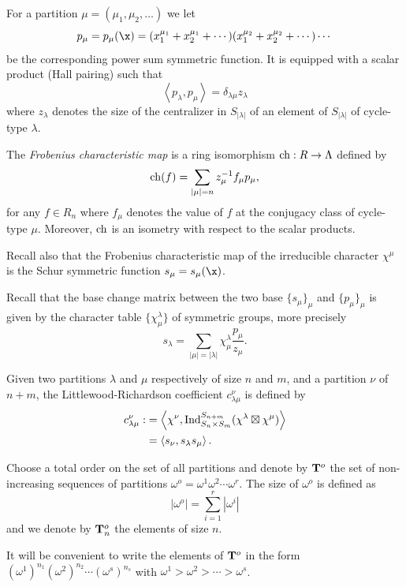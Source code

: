 For a partition $\mu=(\mu_1,\mu_2,\dots)$ we let 
$$
p_\mu=p_\mu(\x)=(x_1^{\mu_1}+x_2^{\mu_1}+\cdots)(x_1^{\mu_2}+x_2^{\mu_2}+\cdots)\cdots
$$
be the corresponding power sum symmetric function.  It is equipped  with a scalar product (Hall pairing) such that
$$
\left\langle p_\lambda,p_\mu\right\rangle=\delta_{\lambda\mu}z_\lambda
$$
where $z_\lambda$ denotes the size of the centralizer in $S_{|\lambda|}$ of an element of $S_{|\lambda|}$ of cycle-type $\lambda$.




The \emph{Frobenius characteristic map} \cite[Chap. I, \S 7]{macdonald} is a ring isomorphism  ${\rm ch}:R\rightarrow\Lambda$ defined by
$$
{\rm ch}(f)=\sum_{|\mu|=n}z_\mu^{-1}f_\mu p_\mu,
$$
for any $f\in R_n$  where $f_\mu$ denotes the value of $f$ at the conjugacy class of cycle-type $\mu$. Moreover, ${\rm ch}$ is an isometry with respect to the scalar products.



Recall also that the Frobenius characteristic map of the irreducible character $\chi^\mu$  is the Schur symmetric function $s_\mu=s_\mu(\x)$.


Recall that the base change matrix between the two base $\{s_\mu\}_\mu$ and $\{p_\mu\}_\mu$ is given by the character table $\{\chi^\lambda_\mu\}$ of symmetric groups, more precisely
\begin{equation}
	s_\lambda=\sum_{|\mu|=|\lambda|}\chi^\lambda_\mu\frac{p_\mu}{z_\mu}.
	\label{Sym}\end{equation}


Given two partitions $\lambda$ and $\mu$ respectively of size $n$ and $m$, and a partition $\nu$ of $n+m$, the Littlewood-Richardson coefficient $c_{\lambda\mu}^\nu$ is defined by
\begin{align}
	c_{\lambda\mu}^\nu:&=\left\langle \chi^\nu,{\rm Ind}_{S_n\times S_m}^{S_{n+m}}(\chi^\lambda\boxtimes\chi^\mu)\right\rangle\label{LRdef}\\
	&=\left\langle s_\nu,s_\lambda s_\mu\right\rangle.\label{LR1}
\end{align}

Choose a total order on the set of all partitions and denote by ${\bf T}^o$ the set of non-increasing sequences of partitions $\omega^o=\omega^1\omega^2\cdots\omega^r$. The size of $\omega^o$ is defined as 
$$
|\omega^o|=\sum_{i=1}^r|\omega^i|
$$
and we denote by ${\bf T}^o_n$ the elements of size $n$. 

It will be convenient to write the elements of ${\bf T}^o$ in the form $(\omega^1)^{n_1}(\omega^2)^{n_2}\cdots(\omega^s)^{n_s}$ with $\omega^1>\omega^2>\cdots>\omega^s$. 

